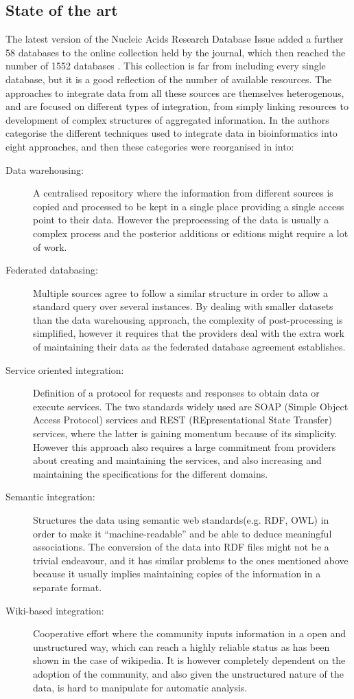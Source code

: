 \subsection{State of the art}
The latest version of the Nucleic Acids Research Database Issue added a further 58 databases to the online collection held by the journal, which then reached the number of 1552 databases \cite{FER2014}. This collection is far from including every single database, but it is  a good reflection of the number of available resources.
The approaches to integrate data from all these sources are themselves heterogenous, and are focused on different types of integration, from simply linking resources to development of complex structures of aggregated information. In \cite{GOB2008} the authors categorise the different techniques used to integrate data in bioinformatics into eight approaches, and then these categories were reorganised in \cite{ZHA2011b} into:
\begin{description}
\item[Data warehousing:] A centralised repository where the information from different sources is copied and processed to be kept  in a single place providing a single access point to their data. However the preprocessing of the data is usually a complex process and the posterior additions or editions might require a lot of work.
\item[Federated databasing:] Multiple sources agree to follow a similar structure in order to allow a standard query over several instances. By dealing with smaller datasets than the data warehousing approach, the complexity of post-processing is simplified, however it requires that the providers deal with the extra work of maintaining their data as the federated database agreement establishes.
\item[Service oriented integration:] Definition of a protocol for requests and responses to obtain data or execute services. The two standards widely used are SOAP (Simple Object Access Protocol) services and REST (REpresentational State Transfer) services, where the latter is gaining momentum because of its simplicity. However this approach also requires a large commitment from providers about creating and maintaining the services, and also increasing and maintaining the specifications for the different domains.
\item[Semantic integration:] Structures the data using semantic web standards(e.g. RDF, OWL) in order to make it ``machine-readable'' and be able to deduce meaningful associations. The conversion of the data into RDF files might not be a trivial endeavour, and it has similar problems to the ones mentioned above because it usually implies maintaining copies of the information in a separate format. 
\item[Wiki-based integration:] Cooperative effort where the community inputs information in a open and unstructured way, which can reach a highly reliable status as has been shown in the case of wikipedia. It is however completely dependent on the adoption of the community, and also given the unstructured nature of the data, is hard to manipulate for automatic analysis.
\end{description}

